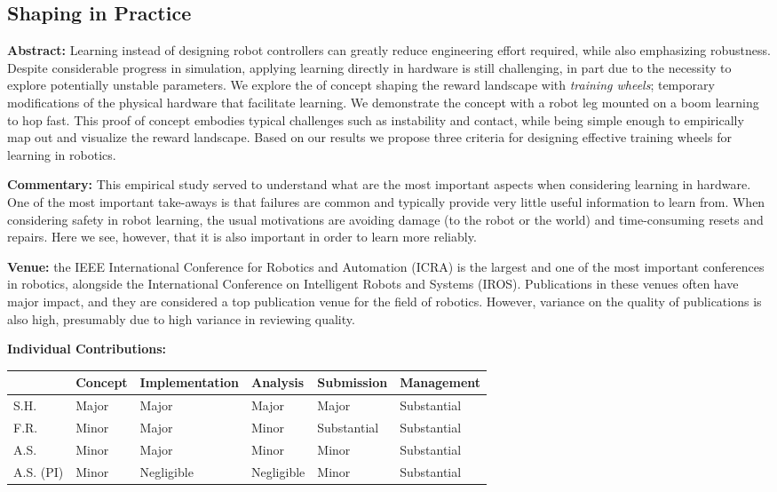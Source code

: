 \subsection{Shaping in Practice}
\textbf{Abstract: }
Learning instead of designing robot controllers can greatly reduce engineering effort required, while also emphasizing robustness. Despite considerable progress in simulation, applying learning directly in hardware is still challenging, in part due to the necessity to explore potentially unstable parameters. We explore the of concept shaping the reward landscape with \emph{training wheels}; temporary modifications of the physical hardware that facilitate learning. We demonstrate the concept with a robot leg mounted on a boom learning to hop fast. This proof of concept embodies typical challenges such as instability and contact, while being simple enough to empirically map out and visualize the reward landscape. Based on our results we propose three criteria for designing effective training wheels for learning in robotics. \par
\textbf{Commentary: }
This empirical study served to understand what are the most important aspects when considering learning in hardware. One of the most important take-aways is that failures are common and typically provide very little useful information to learn from. When considering safety in robot learning, the usual motivations are avoiding damage (to the robot or the world) and time-consuming resets and repairs. Here we see, however, that it is also important in order to learn more reliably. \par
\textbf{Venue: }
the IEEE International Conference for Robotics and Automation (ICRA) is the largest and one of the most important conferences in robotics, alongside the International Conference on Intelligent Robots and Systems (IROS). Publications in these venues often have major impact, and they are considered a top publication venue for the field of robotics. However, variance on the quality of publications is also high, presumably due to high variance in reviewing quality. \par
\textbf{Individual Contributions: }
\begin{table}[H]
\begin{tabular}{l|l|l|l|l|l|}
\cline{2-6}
 \textbf{} & \textbf{Concept} & {\footnotesize \textbf{Implementation}} & \textbf{Analysis} & \textbf{Submission} & {\footnotesize \textbf{Management}} \\ \hline
\multicolumn{1}{|l|}{S.H.} & Major & Major & Major & Major & Substantial \\ \hline
\multicolumn{1}{|l|}{F.R.} & Minor & Major & Minor & Substantial & Substantial \\ \hline
\multicolumn{1}{|l|}{A.S.} & Minor & Major & Minor & Minor & Substantial \\ \hline
\multicolumn{1}{|l|}{A.S. (PI)} & Minor & Negligible & Negligible & Minor & Substantial \\ \hline
\end{tabular}
\end{table}

